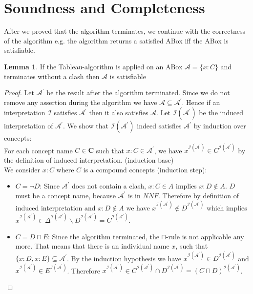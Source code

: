 \documentclass{book}
\theoremstyle{break}
\theoremstyle{definition}
\newtheorem{mylem}{Lemma}
\begin{document}
\section{Soundness and Completeness}
After we proved that the algorithm terminates, we continue with the correctness of the algorithm e.g. the algorithm returns a satisfied ABox iff the ABox is satisfiable.
\begin{mylem}
If the Tableau-algorithm is applied on an ABox $\mathcal{A}=\{x:C\}$ and  terminates without a clash then $\mathcal{A}$ is satisfiable
\end{mylem}
\begin{proof}
Let $\mathcal{A}^\prime$ be the result after the algorithm terminated. Since we do not remove any assertion during the algorithm we have $\mathcal{A}\subseteq\mathcal{A}^\prime$. Hence if an interpretation $\mathcal{I}$ satisfies $\mathcal{A}^\prime$ then it also satisfies $\mathcal{A}$. Let $\mathcal{I}(\mathcal{A}^\prime)$ be the induced interpretation of $\mathcal{A}^\prime$. We show that $\mathcal{I}(\mathcal{A}^\prime)$ indeed satisfies $\mathcal{A}^\prime$ by induction over concepts:\\
For each concept name $C\in\mathbf{C}$ such that $x:C\in\mathcal{A}^\prime$, we have $x^{\mathcal{I}(\mathcal{A}^\prime)}\in C^{\mathcal{I}(\mathcal{A}^\prime)}$ by the definition of induced interpretation. (induction base)\\
We consider $x:C$ where $C$ is a compound concepts (induction step):
\begin{itemize}
\item $C=\neg D$: Since $\mathcal{A}^\prime$ does not contain a clash, $x:C\in A$ implies $x:D\notin A$. $D$ must be a concept name, because $\mathcal{A}^\prime$ is in $NNF$. Therefore by definition of induced interpretation and $x:D\notin A$ we have $x^{\mathcal{I}(\mathcal{A}^\prime)}\notin D^{\mathcal{I}(\mathcal{A}^\prime)}$ which implies $x^{\mathcal{I}(\mathcal{A}^\prime)}\in \Delta^{\mathcal{I}(\mathcal{A}^\prime)}\backslash D^{\mathcal{I}(\mathcal{A}^\prime)}=C^{\mathcal{I}(\mathcal{A}^\prime)}$.
\item $C=D\sqcap E$: Since the algorithm terminated, the $\sqcap$-rule is not applicable any more. That means that there is an individual name $x$, such that $\{x:D, x:E\}\subseteq \mathcal{A}^\prime$. By the induction hypothesis we have $x^{\mathcal{I}(\mathcal{A}^\prime)}\in D^{\mathcal{I}(\mathcal{A}^\prime)}$ and $x^{\mathcal{I}(\mathcal{A}^\prime)}\in E^{\mathcal{I}(\mathcal{A}^\prime)}$. Therefore $x^{\mathcal{I}(\mathcal{A}^\prime)}\in C^{\mathcal{I}(\mathcal{A}^\prime)}\cap D^{\mathcal{I}(\mathcal{A}^\prime)}=(C\sqcap D)^{\mathcal{I}(\mathcal{A}^\prime)}$.

\end{itemize}
\end{proof}
\end{document}
